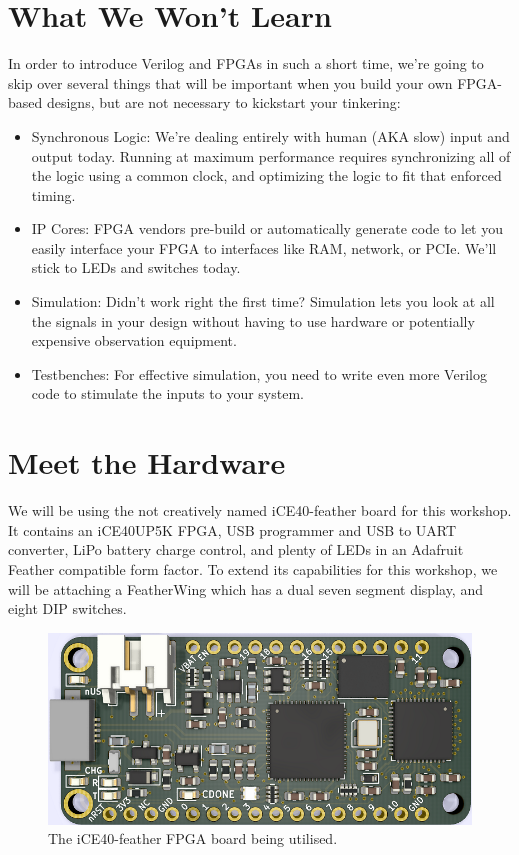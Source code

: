 \documentclass[12pt,a4paper]{article}
\begin{document}
\section{What We Won't Learn}
In order to introduce Verilog and FPGAs in such a short time, we’re going to skip over several things that will be important when you build your own FPGA-based designs, but are not necessary to kickstart your tinkering: 
\begin{itemize}
	\item Synchronous Logic: We’re dealing entirely with human (AKA slow) input and output today. Running at maximum performance requires synchronizing all of the logic using a common clock, and optimizing the logic to fit that enforced timing.
	\item IP Cores: FPGA vendors pre-build or automatically generate code to let you easily interface your FPGA to interfaces like RAM, network, or PCIe. We’ll stick to LEDs and switches today.
	\item Simulation: Didn’t work right the first time? Simulation lets you look at all the signals in your design without having to use hardware or potentially expensive observation equipment.
	\item Testbenches: For effective simulation, you need to write even more Verilog code to stimulate the inputs to your system.
\end{itemize}

\newpage
\section{Meet the Hardware}
We will be using the not creatively named iCE40-feather board for this workshop. It contains an iCE40UP5K FPGA, USB programmer and USB to UART converter, LiPo battery charge control, and plenty of LEDs in an Adafruit Feather compatible form factor. To extend its capabilities for this workshop, we will be attaching a FeatherWing which has a dual seven segment display, and eight DIP switches. 

\begin{figure}[H]
\begin{centering}
	\includegraphics[width=\linewidth]{top_render.PNG}
	\caption{The iCE40-feather FPGA board being utilised.}
\end{centering}
\end{figure}
\end{document}
